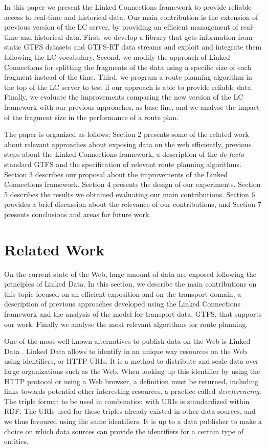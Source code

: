 \documentclass[sw]{iosart2x}
\begin{document}
In this paper we present the Linked Connections framework to provide reliable access to real-time and historical data. Our main contribution is the extension of previous version of the LC server, by providing an efficient management of real-time and historical data. First, we develop a library that gets information from static GTFS datasets and GTFS-RT data streams and exploit and integrate them following the LC vocabulary. Second, we modify the approach of Linked Connections for splitting the fragments of the data using a specific size of each fragment instead of the time. Third, we program a route planning algorithm in the top of the LC server to test if our approach is able to provide reliable data. Finally, we evaluate the improvements comparing the new version of the LC framework with our previous approaches, as base line, and we analyse the impact of the fragment size in the performance of a route plan.

The paper is organized as follows: Section 2 presents some of the related work about relevant approaches about exposing data on the web efficiently,  previous steps about the Linked Connections framework, a description of the \textit{de-facto} standard GTFS and the specification of relevant route planning algorithms. Section 3 describes our proposal about the improvements of the Linked Connections framework. Section 4 presents the design of our experiments. Section 5 describes the results we obtained evaluating our main contributions. Section 6 provides a brief discussion about the relevance of our contributions, and Section 7 presents conclusions and areas for future work.


\section{Related Work}\label{related_work} %
On the current state of the Web, huge amount of data are exposed following the principles of Linked Data. In this section, we describe the main contributions on this topic focused on an efficient exposition and on the transport domain, a description of previous approaches developed using the Linked Connections framework and the analysis of the model for transport data, GTFS, that supports our work. Finally we analyse the most relevant algorithms for route planning.

One of the most well-known alternatives to publish data on the Web is Linked Data \cite{bizer2009linked}. Linked Data allows to identify in an unique way resources on the Web using identifiers, or HTTP URIs. It is a method to distribute and scale data over large organizations such as the Web. When looking up this identifier by using the HTTP protocol or using a Web browser, a definition must be returned, including links towards potential other interesting resources, a practice called \textit{dereferencing}. The triple format to be used in combination with URIs is standardized within RDF. The URIs used for these triples already existed in other data sources, and we thus favoured using the same identifiers. It is up to a data publisher to make a choice on which data sources can provide the identifiers for a certain type of entities. 
\end{document}
